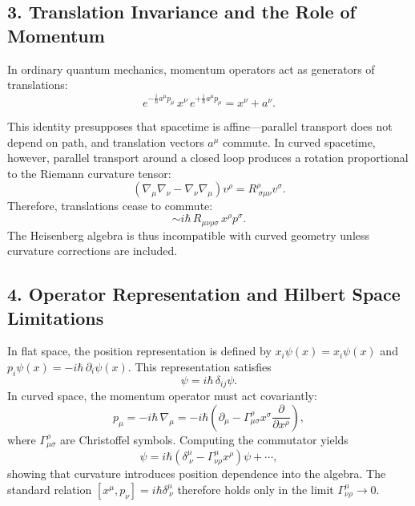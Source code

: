 \documentclass[11pt,oneside]{book}
\numberwithin{equation}{chapter}
\begin{document}
\subsection*{3. Translation Invariance and the Role of Momentum}

In ordinary quantum mechanics, momentum operators act as generators of translations:
\begin{equation}
e^{-\tfrac{i}{\hbar}a^\mu p_\mu}\, x^\nu \,
e^{+\tfrac{i}{\hbar}a^\mu p_\mu}
= x^\nu + a^\nu .
\end{equation}

This identity presupposes that spacetime is affine—parallel transport does not depend on path, and translation vectors $a^\mu$ commute.  
In curved spacetime, however, parallel transport around a closed loop produces a rotation proportional to the Riemann curvature tensor:
\begin{equation}
(\nabla_\mu\nabla_\nu - \nabla_\nu\nabla_\mu) v^\rho = R^\rho_{\ \sigma\mu\nu}v^\sigma.
\end{equation}
Therefore, translations cease to commute:
\begin{equation}
[P_\mu,P_\nu] \sim i\hbar\,R_{\mu\nu\rho\sigma}\,x^\rho p^\sigma.
\end{equation}
The Heisenberg algebra is thus incompatible with curved geometry unless curvature corrections are included.

\subsection*{4. Operator Representation and Hilbert Space Limitations}

In flat space, the position representation is defined by $x_i\psi(x)=x_i\psi(x)$ and $p_i\psi(x)=-i\hbar\,\partial_i\psi(x)$.  
This representation satisfies
\begin{equation}
[x_i,p_j]\psi = i\hbar\,\delta_{ij}\psi.
\end{equation}
In curved space, the momentum operator must act covariantly:
\begin{equation}
p_\mu = -i\hbar\,\nabla_\mu = -i\hbar\left(\partial_\mu - \Gamma^\rho_{\mu\sigma}x^\sigma\frac{\partial}{\partial x^\rho}\right),
\end{equation}
where $\Gamma^\rho_{\mu\sigma}$ are Christoffel symbols.  
Computing the commutator yields
\begin{equation}
[x^\mu,p_\nu]\psi = i\hbar\left(\delta^\mu_{\ \nu} - \Gamma^\mu_{\nu\rho}x^\rho\right)\psi + \cdots,
\end{equation}
showing that curvature introduces position dependence into the algebra.  
The standard relation $[x^\mu,p_\nu]=i\hbar\delta^\mu_{\ \nu}$ therefore holds only in the limit $\Gamma^\mu_{\nu\rho}\to0$.
\end{document}
